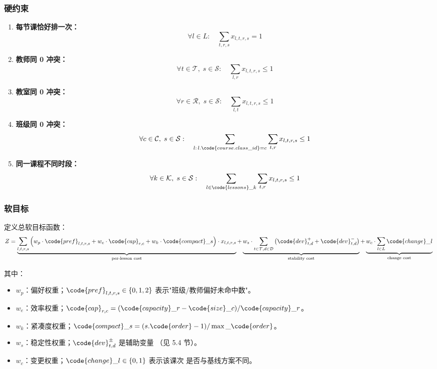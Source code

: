 \subsubsection{硬约束}

\begin{enumerate}[leftmargin=2em,itemsep=0.2em]
\item \textbf{每节课恰好排一次：}
\[
\forall l \in L: \quad \sum_{t,r,s} x_{l,t,r,s} = 1
\]
\item \textbf{教师同 0 冲突：}
\[
\forall t \in \mathcal{T},\; s \in \mathcal{S}: \quad
\sum_{l,r} x_{l,t,r,s} \le 1
\]
\item \textbf{教室同 0 冲突：}
\[
\forall r \in \mathcal{R},\; s \in \mathcal{S}: \quad
\sum_{l,t} x_{l,t,r,s} \le 1
\]
\item \textbf{班级同 0 冲突：}
\[
\forall c \in \mathcal{C},\; s \in \mathcal{S}: \quad
\sum_{l:\,l.\code{course.class\_id}=c} \sum_{t,r} x_{l,t,r,s} \le 1
\]
\item \textbf{同一课程不同时段：}
\[
\forall k \in \mathcal{K},\; s \in \mathcal{S}: \quad
\sum_{l \in \code{lessons}\_k} \sum_{t,r} x_{l,t,r,s} \le 1
\]
\end{enumerate}

\subsubsection{软目标}

定义总软目标函数：
\[
Z = \underbrace{\sum_{l,t,r,s} \Big( w_p \cdot \code{pref}_{l,t,r,s}
+ w_e \cdot \code{cap}_{r,c}
+ w_k \cdot \code{compact}\_s \Big) \cdot x_{l,t,r,s}
}_{\text{per-lesson cost}}
+ \underbrace{w_s \cdot \sum_{t \in \mathcal{T}, d \in \mathcal{D}}
\big( \code{dev}^+_{t,d} + \code{dev}^-_{t,d} \big)}_{\text{stability cost}}
+ \underbrace{w_c \cdot \sum_{l \in L} \code{change}\_l}_{\text{change cost}}
\]

其中：
\begin{itemize}[leftmargin=2em,itemsep=0.1em]
\item $w_p$：偏好权重；$\code{pref}_{l,t,r,s} \in \{0, 1, 2\}$
  表示"班级/教师偏好未命中数"。
\item $w_e$：效率权重；$\code{cap}_{r,c} = (\code{capacity}\_r -
  \code{size}\_c) / \code{capacity}\_r$。
\item $w_k$：紧凑度权重；$\code{compact}\_s = (s.\code{order} - 1) /
  \max\_\code{order}$。
\item $w_s$：稳定性权重；$\code{dev}^\pm_{t,d}$ 是辅助变量
  （见 5.4 节）。
\item $w_c$：变更权重；$\code{change}\_l \in \{0, 1\}$ 表示该课次
  是否与基线方案不同。
\end{itemize}

